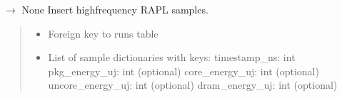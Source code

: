 \documentclass[letterpaper,10pt,english]{sphinxmanual}
\begin{document}
\begin{fulllineitems}
\begin{fulllineitems}
\begin{quote}
\begin{description}
\end{description}\end{quote}

\end{fulllineitems}


\begin{fulllineitems}
\label{\detokenize{core.database.base:core.database.base.DatabaseInterface.insert_energy_samples}}
\pysigstartsignatures
\pysiglinewithargsret
{}
{\sphinxparamcomma {}}
{{ $\rightarrow$ None}}
\pysigstopsignatures
\sphinxAtStartPar
Insert high\sphinxhyphen{}frequency RAPL samples.
\begin{quote}\begin{description}
\begin{itemize}
\item {} 
\sphinxAtStartPar
{} \textendash{} Foreign key to runs table

\item {} 
\sphinxAtStartPar
{} \textendash{} List of sample dictionaries with keys:
\sphinxhyphen{} timestamp\_ns: int
\sphinxhyphen{} pkg\_energy\_uj: int (optional)
\sphinxhyphen{} core\_energy\_uj: int (optional)
\sphinxhyphen{} uncore\_energy\_uj: int (optional)
\sphinxhyphen{} dram\_energy\_uj: int (optional)

\end{itemize}

\end{description}\end{quote}

\end{fulllineitems}



\end{fulllineitems}
\end{document}
